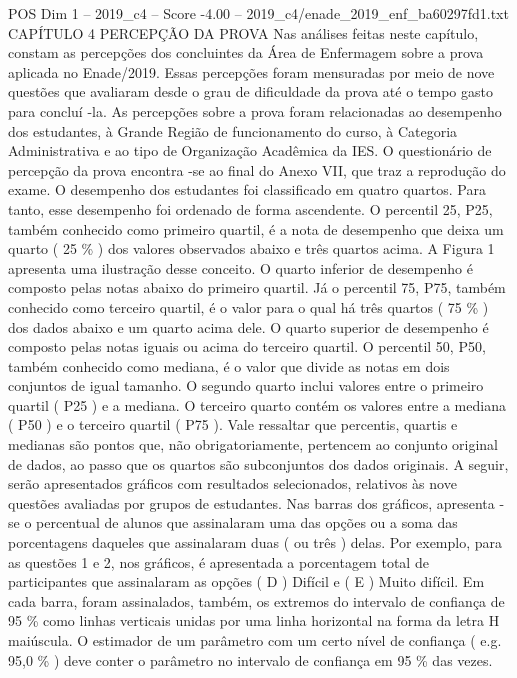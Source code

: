 \begin{textsample}{POS Dim 1 – 2019\_c4 – Score -4.00 – 2019\_c4/enade\_2019\_enf\_ba60297fd1.txt}  \label{ex:f1_pos_343}
CAPÍTULO 4 PERCEPÇÃO DA PROVA Nas análises feitas neste capítulo, constam as percepções dos concluintes da Área de Enfermagem sobre a prova aplicada no Enade/2019.
Essas percepções foram mensuradas por meio de nove questões que avaliaram desde o grau de dificuldade da prova até o tempo gasto para concluí -la.
As percepções sobre a prova foram relacionadas ao desempenho dos estudantes, à Grande Região de funcionamento do curso, à Categoria Administrativa e ao tipo de Organização Acadêmica da IES.
O questionário de percepção da prova encontra -se ao final do Anexo VII, que traz a reprodução do exame.
O desempenho dos estudantes foi classificado em quatro quartos.
Para tanto, esse desempenho foi ordenado de forma ascendente.
O percentil 25, P25, também conhecido como primeiro quartil, é a nota de desempenho que deixa um quarto ( 25 \% ) dos valores observados abaixo e três quartos acima.
A Figura 1 apresenta uma ilustração desse conceito.
O quarto inferior de desempenho é composto pelas notas abaixo do primeiro quartil.
Já o percentil 75, P75, também conhecido como terceiro quartil, é o valor para o qual há três quartos ( 75 \% ) dos dados abaixo e um quarto acima dele.
O quarto superior de desempenho é composto pelas notas iguais ou acima do terceiro quartil.
O percentil 50, P50, também conhecido como mediana, é o valor que divide as notas em dois conjuntos de igual tamanho.
O segundo quarto inclui valores entre o primeiro quartil ( P25 ) e a mediana.
O terceiro quarto contém os valores entre a mediana ( P50 ) e o terceiro quartil ( P75 ).
Vale ressaltar que percentis, quartis e medianas são pontos que, não obrigatoriamente, pertencem ao conjunto original de dados, ao passo que os quartos são subconjuntos dos dados originais.
A seguir, serão apresentados gráficos com resultados selecionados, relativos às nove questões avaliadas por grupos de estudantes.
Nas barras dos gráficos, apresenta -se o percentual de alunos que assinalaram uma das opções ou a soma das porcentagens daqueles que assinalaram duas ( ou três ) delas.
Por exemplo, para as questões 1 e 2, nos gráficos, é apresentada a porcentagem total de participantes que assinalaram as opções ( D ) Difícil e ( E ) Muito difícil.
Em cada barra, foram assinalados, também, os extremos do intervalo de confiança de 95 \% como linhas verticais unidas por uma linha horizontal na forma da letra H maiúscula.
O estimador de um parâmetro com um certo nível de confiança ( e.g. 95,0 \% ) deve conter o parâmetro no intervalo de confiança em 95 \% das vezes.

\end{textsample}
